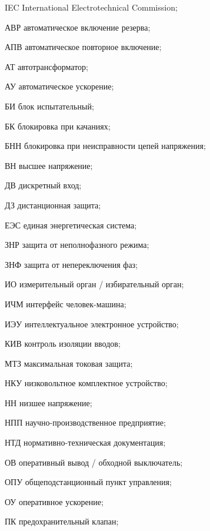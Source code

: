 \begin{list}{}%
{%
  \setlength{\labelwidth}{\abbrwidth}%
  \setlength{\labelsep}{0pt}%
  \setlength{\leftmargin}{\dimexpr\labelwidth+\labelsep\relax}%
  \setlength{\itemindent}{0pt}%
  \setlength{\parsep}{0pt}%
  \setlength{\itemsep}{0pt}
  \renewcommand{\makelabel}[1]{#1 --\hspace{\abbrgap}}%
}
\item[IEC]  International Electrotechnical Commission;
\item[АВР] автоматическое включение резерва;
\item[АПВ] автоматическое повторное включение;
\item[АТ] автотрансформатор;
\item[АУ] автоматическое ускорение;
\item[БИ] блок испытательный;
\item[БК] блокировка при качаниях;
\item[БНН] блокировка при неисправности цепей напряжения;
\item[ВН] высшее напряжение;
\item[ДВ] дискретный вход;
\item[ДЗ] дистанционная защита;
\item[ЕЭС] единая энергетическая система;
\item[ЗНР] защита от неполнофазного режима;
\item[ЗНФ] защита от непереключения фаз;
\item[ИО] измерительный орган / избирательный орган;
\item[ИЧМ] интерфейс человек-машина;
\item[ИЭУ] интеллектуальное электронное устройство;
\item[КИВ] контроль изоляции вводов;
\item[МТЗ] максимальная токовая защита;
\item[НКУ] низковольтное комплектное устройство;
\item[НН] низшее напряжение;
\item[НПП] научно-производственное предприятие;
\item[НТД] нормативно-техническая документация;
\item[ОВ] оперативный вывод / обходной выключатель;
\item[ОПУ] общеподстанционный пункт управления;
\item[ОУ] оперативное ускорение;
\item[ПК] предохранительный клапан;

\end{list}
